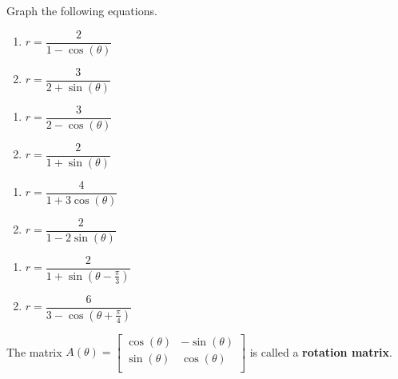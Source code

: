 \documentclass{ximera}
\begin{document}
Graph the following equations.

\begin{multicols}{2}

\begin{enumerate}
\setcounter{enumi}{\value{HW}}
\item  $r = \dfrac{2}{1-\cos(\theta)}$

\item  $r = \dfrac{3}{2 + \sin(\theta)}$
\setcounter{HW}{\value{enumi}}
\end{enumerate}
\end{multicols}

\begin{multicols}{2}

\begin{enumerate}
\setcounter{enumi}{\value{HW}}
\item  $r = \dfrac{3}{2-\cos(\theta)}$

\item  $r = \dfrac{2}{1 + \sin(\theta)}$
\setcounter{HW}{\value{enumi}}
\end{enumerate}
\end{multicols}

\begin{multicols}{2}

\begin{enumerate}
\setcounter{enumi}{\value{HW}}

\item   $r = \dfrac{4}{1+3\cos(\theta)}$

\item  $r = \dfrac{2}{1-2\sin(\theta)}$

\setcounter{HW}{\value{enumi}}
\end{enumerate}
\end{multicols}

\begin{multicols}{2}

\begin{enumerate}
\setcounter{enumi}{\value{HW}}
\item  $r = \dfrac{2}{1 + \sin(\theta - \frac{\pi}{3})}$

\item  $r = \dfrac{6}{3 - \cos\left(\theta + \frac{\pi}{4}\right)}$
\setcounter{HW}{\value{enumi}}
\end{enumerate}
\end{multicols}


 The matrix $A(\theta) = \left[ \begin{array}{rr} \cos(\theta) & -\sin(\theta) \\ \sin(\theta) & \cos(\theta) \\ \end{array} \right]$  is called a \textbf{rotation matrix}. 
 
\end{document}
